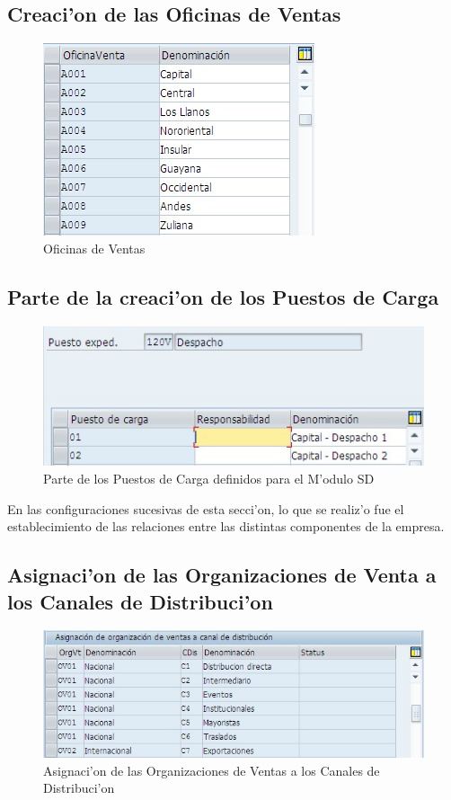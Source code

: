 \subsection*{Creaci'on de las Oficinas de Ventas}
\begin{figure}[H]
\centering
\includegraphics[scale=0.65,type=jpg,ext=.jpg,read=.jpg]{figures/OfVenta}
\caption{Oficinas de Ventas}
\label{fig:oficinas}
\end{figure}

\subsection*{Parte de la creaci'on de los Puestos de Carga}
\begin{figure}[htb]
\centering
\includegraphics[scale=0.65,type=jpg,ext=.jpg,read=.jpg]{figures/PuestoCarga}
\caption{Parte de los Puestos de Carga definidos para el M'odulo SD}
\label{fig:carga}
\end{figure}

	En las configuraciones sucesivas de esta secci'on, lo que se realiz'o fue el establecimiento de las relaciones entre las distintas componentes de la empresa.

\subsection*{Asignaci'on de las Organizaciones de Venta a los Canales de Distribuci'on}	
\begin{figure}[H]
\centering
\includegraphics[scale=0.65,type=jpg,ext=.jpg,read=.jpg]{figures/OrgVentasCanales}
\caption{Asignaci'on de las Organizaciones de Ventas a los Canales de Distribuci'on}
\label{fig:asigna2}
\end{figure}

